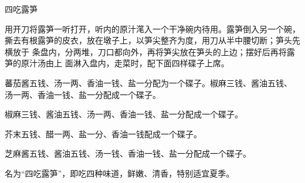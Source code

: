 %
%
%
%
%
%
%
\begin{recipe}{四吃露笋}

\ingredients


\preparation

\step 用开刀将露笋一听打开，听内的原汁滗入一个干净碗内待用。露笋倒入另一个碗，
撕去有根露笋的皮衣，放在墩子上，以笋尖整齐为度，用刀从半中腰切断；笋头先横放于
条盘内，分两堆，刀口都向外，再将笋尖放在笋头的上边；摆好后再将露笋的原汁汤由上
面淋入盘内，走菜时，配下面四样碟子上席。

\step 蕃茄酱五钱、汤一两、香油一钱、盐一分配为一个碟子。椒麻三钱、酱油五钱、
汤一两、香油一钱、盐一分配成一个碟子。

\step 椒麻三钱、酱油五钱、汤一两、香油一钱、盐一分配成一个碟子。

\step 芥末五钱、醋一两、盐一分、香油一钱配成一个碟子。

\step 芝麻酱五钱、酱油五钱、汤一钱、香油一钱、盐一分配成一个碟子。

\features

名为“四吃露笋”，即吃四种味道，鲜嫩、清香，特别适宜夏季。

\end{recipe}


